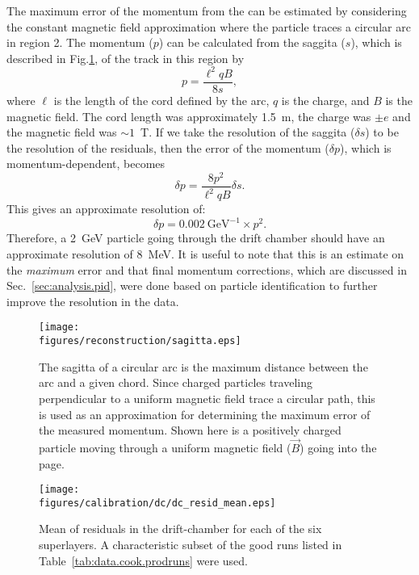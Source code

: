 The maximum error of the momentum from the  can be estimated by considering the constant magnetic field approximation where the particle traces a circular arc in region 2. The momentum ($p$) can be calculated from the saggita ($s$), which is described in Fig.\ref{fig:sagitta}, of the track in this region by
\begin{equation}
    p = \frac{\ell^2 q B}{8 s},
    \label{eqn:momentum_saggita}
\end{equation}
where $\ell$ is the length of the cord defined by the arc, $q$ is the charge, and $B$ is the magnetic field. The cord length was approximately 1.5~m, the charge was $\pm e$ and the magnetic field was $\sim 1$~T. If we take the resolution of the saggita ($\delta s$) to be the resolution of the residuals, then the error of the momentum ($\delta p$), which is momentum-dependent, becomes
\begin{equation}
    \delta p = \frac{8 p^2}{\ell^2 q B} \delta s.
    \label{eqn:momentum_saggita_err}
\end{equation}
This gives an approximate resolution of:
\begin{equation}
    \delta p = 0.002~\mathrm{GeV}^{-1} \times p^2.
    \label{eqn:momentum_resolution}
\end{equation}
Therefore, a 2~GeV particle going through the drift chamber should have an approximate resolution of 8~MeV. It is useful to note that this is an estimate on the \emph{maximum} error and that final momentum corrections, which are discussed in Sec.~\ref{sec:analysis.pid}, were done based on particle identification to further improve the resolution in the data.

\begin{figure}\begin{center}
\texttt{[image: \\figures/reconstruction/sagitta.eps]}
\caption[Saggita of a Circular Arc]{\label{fig:sagitta}The sagitta of a circular arc is the maximum distance between the arc and a given chord. Since charged particles traveling perpendicular to a uniform magnetic field trace a circular path, this is used as an approximation for determining the maximum error of the measured momentum. Shown here is a positively charged particle moving through a uniform magnetic field ($\vec{B}$) going into the page.}
\end{center}\end{figure}

\begin{figure}\begin{center}
\texttt{[image: \\figures/calibration/dc/dc\_resid\_mean.eps]}
\caption[ Resolution (Residuals, mean)]{\label{fig:data.calib.dc_res_mean}{}Mean of residuals in the drift-chamber for each of the six superlayers. A characteristic subset of the good runs listed in Table~\ref{tab:data.cook.prodruns} were used.}
\end{center}\end{figure}

